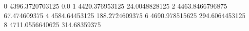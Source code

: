 0 4396.3720703125 0.0
1 4420.376953125 24.0048828125
2 4463.8466796875 67.474609375
4 4584.64453125 188.2724609375
6 4690.978515625 294.6064453125
8 4711.0556640625 314.68359375
